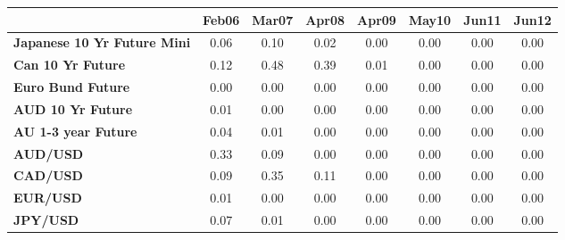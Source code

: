 \begin{scriptsize}
\begin{tabular}{lccccccc}
&\textbf{Feb06}&\textbf{Mar07}&\textbf{Apr08}&\textbf{Apr09}&\textbf{May10}&\textbf{Jun11}&\textbf{Jun12}\\\hline
\textbf{Japanese 10 Yr Future Mini}&0.06&0.10&0.02&0.00&0.00&0.00&0.00\\
\textbf{Can 10 Yr Future}&0.12&0.48&0.39&0.01&0.00&0.00&0.00\\
\textbf{Euro Bund Future}&0.00&0.00&0.00&0.00&0.00&0.00&0.00\\
\textbf{AUD 10 Yr Future}&0.01&0.00&0.00&0.00&0.00&0.00&0.00\\
\textbf{AU 1-3 year Future}&0.04&0.01&0.00&0.00&0.00&0.00&0.00\\
\textbf{AUD/USD}&0.33&0.09&0.00&0.00&0.00&0.00&0.00\\
\textbf{CAD/USD}&0.09&0.35&0.11&0.00&0.00&0.00&0.00\\
\textbf{EUR/USD}&0.01&0.00&0.00&0.00&0.00&0.00&0.00\\
\textbf{JPY/USD}&0.07&0.01&0.00&0.00&0.00&0.00&0.00\\
\end{tabular}
\end{scriptsize}
